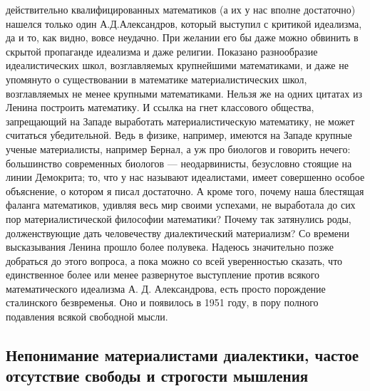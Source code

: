 действительно  квалифицированных  математиков  (а   их  у  нас  вполне
достаточно) нашелся  только один  А.Д.Александров, который  выступил с
критикой идеализма,  да и то,  как видно, вовсе неудачно.  При желании
его  бы даже  можно обвинить  в  скрытой пропаганде  идеализма и  даже
религии.  Показано  разнообразие идеалистических  школ,  возглавляемых
крупнейшими  математиками,  и  даже  не упомянуто  о  существовании  в
математике  материалистических школ,  возглавляемых не  менее крупными
математиками.  Нельзя   же  на  одних  цитатах   из  Ленина  построить
математику.  И  ссылка на  гнет  классового  общества, запрещающий  на
Западе  выработать материалистическую  математику, не  может считаться
убедительной.  Ведь  в физике,  например,  имеются  на Западе  крупные
ученые материалисты,  например Бернал,  а уж  про биологов  и говорить
нечего: большинство современных биологов --- неодарвинисты, безусловно
стоящие  на  линии Демокрита;  то,  что  у нас  называют  идеалистами,
имеет совершенно  особое объяснение, о  котором я писал  достаточно. А
кроме того,  почему наша  блестящая фаланга математиков,  удивляя весь
мир  своими  успехами, не  выработала  до  сих пор  материалистической
философии  математики?  Почему  так  затянулись  роды,  долженствующие
дать человечеству диалектический  материализм? Со времени высказывания
Ленина прошло  более полувека. Надеюсь значительно  позже добраться до
этого  вопроса,  а  пока  можно  со  всей  уверенностью  сказать,  что
единственное более  или менее  развернутое выступление  против всякого
математического идеализма  А. Д. Александрова, есть  просто порождение
сталинского безвременья. Оно  и появилось в 1951 году,  в пору полного
подавления всякой свободной мысли.

\subsection{Непонимание  материалистами диалектики,  частое отсутствие
свободы и строгости мышления}

